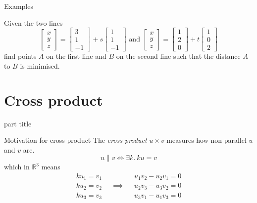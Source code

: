 \documentclass{beamer}
\begin{document}
\begin{frame}{Examples}
\begin{example}
Given the two lines
\begin{equation*}
\left[
\begin{array}{c}
x\\
y\\
z
\end{array}
\right] = \left[
\begin{array}{c}
3\\
1\\
-1
\end{array}
\right]+s \left[
\begin{array}{c}
1\\
1\\
-1
\end{array}
\right]\text{ and } \left[
\begin{array}{c}
x\\
y\\
z
\end{array}
\right] = \left[
\begin{array}{c}
1\\
2\\
0
\end{array}
\right] +t \left[
\begin{array}{c}
1\\
0\\
2
\end{array}
\right]
\end{equation*}
find points $A$ on the first line and $B$ on the second line such that the distance $A$ to $B$ is minimised.
\end{example}
\end{frame}

\section{Cross product}

\begin{frame}
\begin{beamercolorbox}[sep=12pt,center]{part title}
\insertsection\par
\end{beamercolorbox}
\end{frame}

\begin{frame}{Motivation for cross product}
The \emph{cross product} $u\times v$ measures how non-parallel $u$ and $v$ are.
\begin{equation*}
u \| v \iff \exists k.~ku = v
\end{equation*}
which in $\mathbb{R}^3$ means
\begin{align*}
k u_1 = v_1 && &&u_1v_2 - u_2v_1 = 0\\
ku_2 = v_2 &&\implies & &u_2v_3 - u_3v_2 = 0\\
ku_3 = v_3 && & &u_3v_1 - u_1v_3 = 0
\end{align*}
\end{frame}
\end{document}
